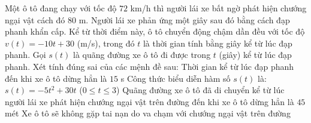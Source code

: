 \begin{ex}%
 Một ô tô đang chạy với tốc độ $72$ km/h thì người lái xe bất ngờ phát hiện chướng ngại vật cách đó $80$ m. Người lái xe phản ứng một giây sau đó bằng cách đạp phanh khẩn cấp. Kể từ thời điểm này, ô tô chuyển động chậm dần đều với tốc độ $v(t)=-10t + 30$ (m/s), trong đó $t$ là thời gian tính bằng giây kể từ lúc đạp phanh. Gọi $s(t)$ là quãng đường xe ô tô đi được trong $t$ (giây) kể từ lúc đạp phanh. Xét tính đúng sai của các mệnh đề sau:
 \choiceTF
 {Thời gian kể từ lúc đạp phanh đến khi xe ô tô dừng hẳn là $15$ s}
 {\True Công thức biểu diễn hàm số $s(t)$ là: $s(t)=-5t^2 + 30t$ ($0 \le t \le 3$)}
 {Quãng đường xe ô tô đã di chuyển kể từ lúc người lái xe phát hiện chướng ngại vật trên đường đến khi xe ô tô dừng hẳn là $45$ mét}
 {\True Xe ô tô sẽ không gặp tai nạn do va chạm với chướng ngại vật trên đường}
\end{ex}
